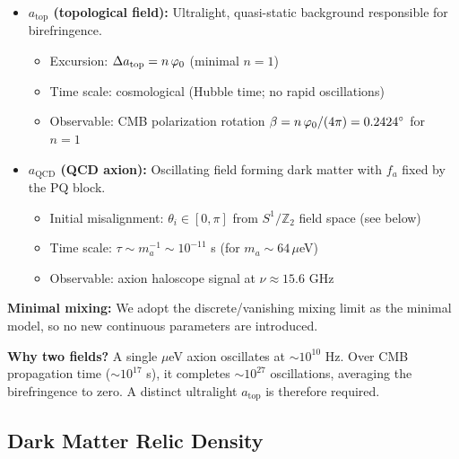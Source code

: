 \begin{tcolorbox}[colback=orange!5, colframe=orange!60!black, 
    title={\textbf{Two-Field Axion Structure}}, fonttitle=\bfseries]
\begin{itemize}[leftmargin=1.5em, topsep=2pt, itemsep=2pt]
    \item \textbf{$a_{\text{top}}$ (topological field):} Ultralight, quasi-static background
        responsible for birefringence.
        \begin{itemize}[leftmargin=1em, topsep=1pt]
            \item Excursion: $\Delta a_{\text{top}} = n\,\varphi_0$ (minimal $n=1$)
            \item Time scale: cosmological (Hubble time; no rapid oscillations)
            \item Observable: CMB polarization rotation $\beta = n\,\varphi_0/(4\pi) = 0.2424^\circ$ for $n=1$
        \end{itemize}
    \item \textbf{$a_{\text{QCD}}$ (QCD axion):} Oscillating field forming dark matter with
        $f_a$ fixed by the PQ block.
        \begin{itemize}[leftmargin=1em, topsep=1pt]
            \item Initial misalignment: $\theta_i \in [0,\pi]$ from $S^1/\mathbb{Z}_2$ field space (see below)
            \item Time scale: $\tau \sim m_a^{-1} \sim 10^{-11}$ s (for $m_a \sim 64\,\mu$eV)
            \item Observable: axion haloscope signal at $\nu \approx 15.6$ GHz
        \end{itemize}
\end{itemize}

\textbf{Minimal mixing:} We adopt the discrete/vanishing mixing limit as the minimal model,
so no new continuous parameters are introduced.
\end{tcolorbox}
\textbf{Why two fields?} A single $\mu$eV axion oscillates at $\sim 10^{10}$ Hz. Over CMB 
propagation time ($\sim 10^{17}$ s), it completes $\sim 10^{27}$ oscillations, averaging 
the birefringence to zero. A distinct ultralight $a_{\text{top}}$ is therefore required.

\subsection{Dark Matter Relic Density}

